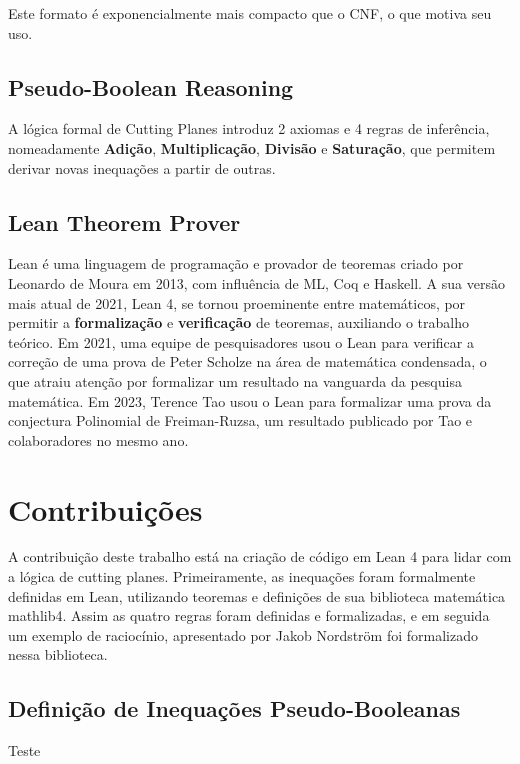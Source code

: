 \documentclass[conference]{IEEEtran}
\begin{document}
Este formato é exponencialmente mais compacto que o CNF, o que motiva seu uso\cite{PBSolve}.

\subsection{Pseudo-Boolean Reasoning}
A lógica formal de Cutting Planes introduz 2 axiomas e 4 regras de inferência, nomeadamente
\textbf{Adição}, \textbf{Multiplicação}, \textbf{Divisão} e \textbf{Saturação},
que permitem derivar novas inequações a partir de outras\cite{CutPlane}.

\subsection{Lean Theorem Prover}
Lean é uma linguagem de programação e provador de teoremas criado por Leonardo de Moura em 2013\cite{LeanProver}, com
influência de ML, Coq e Haskell.
A sua versão mais atual de 2021, Lean 4\cite{Lean4}, se tornou proeminente entre matemáticos, por permitir a
\textbf{formalização} e \textbf{verificação} de teoremas, auxiliando o trabalho teórico.
Em 2021, uma equipe de pesquisadores usou o Lean para verificar a correção de uma prova de Peter Scholze na área
de matemática condensada\cite{LTE}, o que atraiu atenção por formalizar um resultado na vanguarda da pesquisa matemática.
Em 2023, Terence Tao usou o Lean para formalizar uma prova da conjectura Polinomial de Freiman-Ruzsa\cite{PFR},
um resultado publicado por Tao e colaboradores no mesmo ano.

\section{Contribuições}
A contribuição deste trabalho está na criação de código em Lean 4 para lidar com a lógica de cutting planes.
Primeiramente, as inequações foram formalmente definidas em Lean, utilizando teoremas e definições de sua biblioteca
matemática mathlib4\cite{mathlib4}. Assim as quatro regras foram definidas e formalizadas, e em seguida um exemplo de
raciocínio, apresentado por Jakob Nordström foi formalizado nessa biblioteca.

\subsection{Definição de Inequações Pseudo-Booleanas}
Teste
\end{document}

